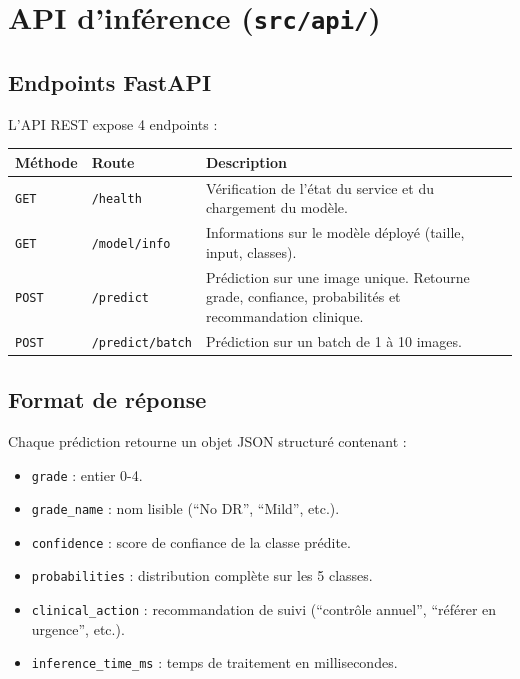 ﻿\documentclass[11pt,a4paper]{article}
\begin{document}
\section{API d'inférence (\texttt{src/api/})}

\subsection{Endpoints FastAPI}

L'API REST expose 4 endpoints :

\begin{center}
\renewcommand{\arraystretch}{1.4}
\begin{tabularx}{\textwidth}{llX}
\toprule
\textbf{Méthode} & \textbf{Route} & \textbf{Description} \\
\midrule
\texttt{GET} & \texttt{/health} & Vérification de l'état du service et du chargement du modèle. \\
\texttt{GET} & \texttt{/model/info} & Informations sur le modèle déployé (taille, input, classes). \\
\texttt{POST} & \texttt{/predict} & Prédiction sur une image unique. Retourne grade, confiance, probabilités et recommandation clinique. \\
\texttt{POST} & \texttt{/predict/batch} & Prédiction sur un batch de 1 à 10 images. \\
\bottomrule
\end{tabularx}
\end{center}

\subsection{Format de réponse}

Chaque prédiction retourne un objet JSON structuré contenant :
\begin{itemize}[leftmargin=2em]
  \item \texttt{grade} : entier 0-4.
  \item \texttt{grade\_name} : nom lisible (``No DR'', ``Mild'', etc.).
  \item \texttt{confidence} : score de confiance de la classe prédite.
  \item \texttt{probabilities} : distribution complète sur les 5 classes.
  \item \texttt{clinical\_action} : recommandation de suivi (``contrôle annuel'', ``référer en urgence'', etc.).
  \item \texttt{inference\_time\_ms} : temps de traitement en millisecondes.
\end{itemize}
\end{document}
